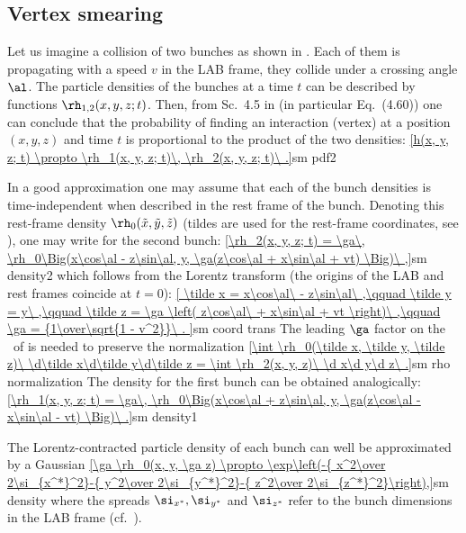 \subsection{Vertex smearing}


Let us imagine a collision of two bunches as shown in . Each of them is propagating with a speed $v$ in the LAB frame, they collide under a crossing angle $\al$. The particle densities of the bunches at a time $t$ can be described by functions $\rh_{1, 2}(x, y, z; t)$. Then, from Sc.~4.5 in  (in particular Eq.~(4.60)) one can conclude that the probability of finding an interaction (vertex) at a position $(x, y, z)$ and time $t$ is proportional to the product of the two densities:
\eqref{h(x, y, z; t) \propto \rh_1(x, y, z; t)\, \rh_2(x, y, z; t)\ .}{sm pdf2}

In a good approximation one may assume that each of the bunch densities is time-independent when described in the rest frame of the bunch. Denoting this rest-frame density $\rh_0(\tilde x, \tilde y, \tilde z)$ (tildes are used for the rest-frame coordinates, see ), one may write for the second bunch:
\eqref{\rh_2(x, y, z; t) = \ga\, \rh_0\Big(x\cos\al - z\sin\al, y, \ga(z\cos\al + x\sin\al + vt) \Big)\ ,}{sm density2}
which follows from the Lorentz transform (the origins of the LAB and rest frames coincide at $t=0$):
\eqref{
	\tilde x = x\cos\al\ - z\sin\al\ ,\qquad
	\tilde y = y\ ,\qquad
	\tilde z = \ga \left( z\cos\al\ + x\sin\al + vt \right)\ ,\qquad
	\ga = {1\over\sqrt{1 - v^2}}\ .
}{sm coord trans}
The leading $\ga$ factor on the \rhs~of  is needed to preserve the normalization
\eqref{\int \rh_0(\tilde x, \tilde y, \tilde z)\ \d\tilde x\d\tilde y\d\tilde z = \int \rh_2(x, y, z)\ \d x\d y\d z\ .}{sm rho normalization}
The density for the first bunch can be obtained analogically:
\eqref{\rh_1(x, y, z; t) = \ga\, \rh_0\Big(x\cos\al + z\sin\al, y, \ga(z\cos\al - x\sin\al - vt) \Big)\ .}{sm density1}

The Lorentz-contracted particle density of each bunch can well be approximated by a Gaussian 
\eqref{\ga \rh_0(x, y, \ga z) \propto \exp\left(-{ x^2\over 2\si_{x^*}^2}-{ y^2\over 2\si_{y^*}^2}-{ z^2\over 2\si_{z^*}^2}\right),}{sm density}
where the spreads $\si_{x^*}, \si_{y^*}$ and $\si_{z^*}$ refer to the bunch dimensions in the LAB frame (cf.~).


